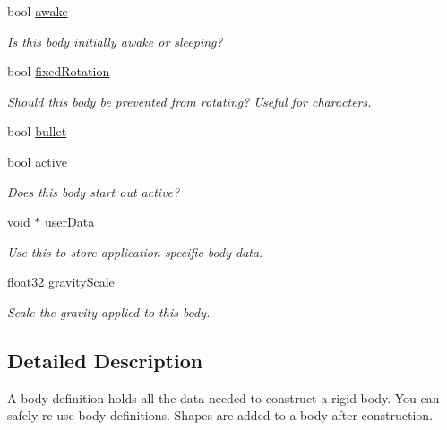 \begin{DoxyCompactItemize}
bool \hyperlink{structb2_body_def_a17a8102638aac41e7ab94278651a45bd}{awake}
\begin{DoxyCompactList}\small\item\em Is this body initially awake or sleeping? \end{DoxyCompactList}\item 
\mbox{\label{structb2_body_def_a273a51c57440a8884de5939d76b6e3ea}} 
bool \hyperlink{structb2_body_def_a273a51c57440a8884de5939d76b6e3ea}{fixed\+Rotation}
\begin{DoxyCompactList}\small\item\em Should this body be prevented from rotating? Useful for characters. \end{DoxyCompactList}\item 
bool \hyperlink{structb2_body_def_a7c0047c9a98a1d20614eeddcdbce7586}{bullet}
\item 
\mbox{\label{structb2_body_def_adf6f3e9a9e124e080c68bc0edeb170df}} 
bool \hyperlink{structb2_body_def_adf6f3e9a9e124e080c68bc0edeb170df}{active}
\begin{DoxyCompactList}\small\item\em Does this body start out active? \end{DoxyCompactList}\item 
\mbox{\label{structb2_body_def_ae457dd1d39be09945eace6061121be29}} 
void $\ast$ \hyperlink{structb2_body_def_ae457dd1d39be09945eace6061121be29}{user\+Data}
\begin{DoxyCompactList}\small\item\em Use this to store application specific body data. \end{DoxyCompactList}\item 
\mbox{\label{structb2_body_def_aadea3fa173ed1014739ec8b023de4336}} 
float32 \hyperlink{structb2_body_def_aadea3fa173ed1014739ec8b023de4336}{gravity\+Scale}
\begin{DoxyCompactList}\small\item\em Scale the gravity applied to this body. \end{DoxyCompactList}\end{DoxyCompactItemize}


\subsection{Detailed Description}
A body definition holds all the data needed to construct a rigid body. You can safely re-\/use body definitions. Shapes are added to a body after construction. 

